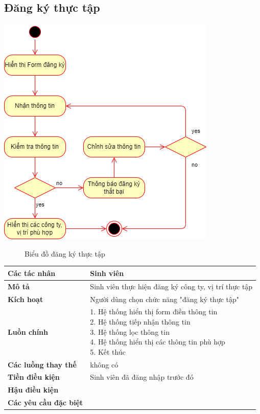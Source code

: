 \subsection{Đăng ký thực tập}
\begin{center}
	\includegraphics[width=.9\textwidth]{../drawio/activity/register_thuctap.png}
	\begin{figure}[h]
		\centering
		\caption{Biểu đồ đăng ký thực tập}
	\end{figure}
\end{center}
\begin{tabular}{|l|l|}
	\hline
	\textbf{Các tác nhân}         & Sinh viên                                             \\
	\hline
	\textbf{Mô tả}                & Sinh viên thực hiện đăng ký công ty, vị trí thực tập  \\
	\hline
	\textbf{Kích hoạt}            & Người dùng chọn chức năng "đăng ký thực tập"          \\
	\hline
	\textbf{Luồn chính}           & \makecell[l]{1. Hệ thống hiển thị form điền thông tin \\ 2. Hệ thống tiếp nhận thông tin \\ 3. Hệ thống lọc thông tin \\ 4. Hệ thống hiển thị các thông tin phù hợp \\ 5. Kết thúc} \\
	\hline
	\textbf{Các luồng thay thế}   & không có                                              \\
	\hline
	\textbf{Tiền điều kiện}       & Sinh viên đã đăng nhập trước đó                       \\
	\hline
	\textbf{Hậu điều kiện}        &                                                       \\
	\hline
	\textbf{Các yêu cầu đặc biệt} &                                                       \\
	\hline
\end{tabular}

